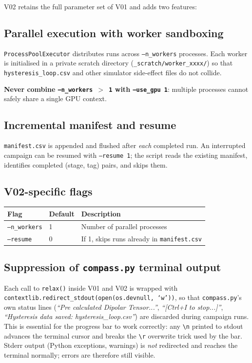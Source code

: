 \documentclass[11pt,a4paper]{article}
\newcommand{\code}[1]{\texttt{#1}}
\newcommand{\param}[1]{\texttt{--#1}}
\newcommand{\warn}[1]{\textcolor{warnorange}{\textbf{#1}}}
\begin{document}
V02 retains the full parameter set of V01 and adds two features:

\subsection{Parallel execution with worker sandboxing}

\texttt{ProcessPoolExecutor} distributes runs across \param{n\_workers}
processes.  Each worker is initialised in a private scratch directory
(\texttt{\_scratch/worker\_xxxx/}) so that \texttt{hysteresis\_loop.csv}
and other simulator side-effect files do not collide.

\warn{Never combine \texttt{--n\_workers $>$ 1} with \texttt{--use\_gpu 1}}:
multiple processes cannot safely share a single GPU context.

\subsection{Incremental manifest and resume}

\texttt{manifest.csv} is appended and flushed after \textit{each} completed
run.  An interrupted campaign can be resumed with \param{resume~1}; the script
reads the existing manifest, identifies completed (stage, tag) pairs, and
skips them.

\subsection{V02-specific flags}

\begin{tabular}{p{3.5cm}p{2.2cm}p{9cm}}
\toprule
Flag & Default & Description \\
\midrule
\param{n\_workers} & 1 & Number of parallel processes \\
\param{resume} & 0 & If 1, skips runs already in \texttt{manifest.csv} \\
\bottomrule
\end{tabular}

\subsection{Suppression of \texttt{compass.py} terminal output}

Each call to \code{relax()} inside V01 and V02 is wrapped with
\code{contextlib.redirect\_stdout(open(os.devnull,~`w'))}, so that
\texttt{compass.py}'s own status lines
(\textit{``Pre calculated Dipolar Tensor...''},
\textit{``[Ctrl+I to stop...]''},
\textit{``Hysteresis data saved: hysteresis\_loop.csv''})
are discarded during campaign runs.
This is essential for the progress bar to work correctly: any
\texttt{\textbackslash n} printed to stdout advances the terminal cursor and
breaks the \texttt{\textbackslash r} overwrite trick used by the bar.
Stderr output (Python exceptions, warnings) is \textit{not} redirected and
reaches the terminal normally; errors are therefore still visible.
\end{document}
